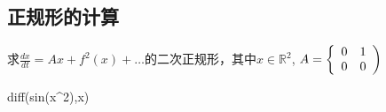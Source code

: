 \subsection{正规形的计算}

\begin{example}
  求$\frac { d x } { d t } = A x + f ^ { 2 } ( x ) + \dots$的二次正规形，其中\(x\in \mathbb{R}^2\),
  $A = \left\{
    \begin{array} { l l }
      { 0 } & { 1 } \\
      { 0 } & { 0 }
    \end{array}
  \right)$
\end{example}

\begin{maxima}[]
diff(sin(x^2),x)
\end{maxima}


